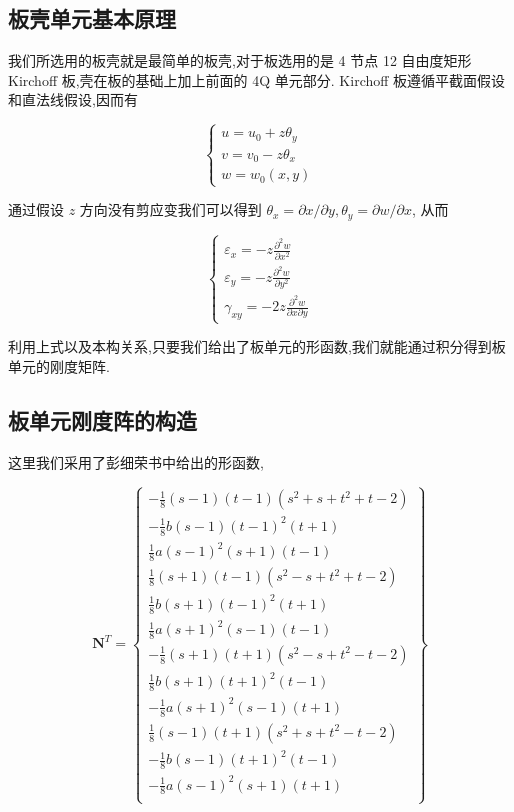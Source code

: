 
\subsection{板壳单元基本原理}
我们所选用的板壳就是最简单的板壳,对于板选用的是 4 节点 12 自由度矩形 Kirchoff 板,壳在板的基础上加上前面的 4Q 单元部分. Kirchoff 板遵循平截面假设和直法线假设,因而有

\[
\left\{ \begin{gathered}
u=u_0+z\theta_y \\
v=v_0-z\theta_x \\
w=w_0(x,y)
\end{gathered} \right.
\]

通过假设 $z$ 方向没有剪应变我们可以得到 $\theta_x=\partial x/\partial y, \theta_y=\partial w/\partial x$, 从而

\[
\left\{ \begin{gathered}
\varepsilon_x = -z\frac{\partial^2 w}{\partial x^2} \\
\varepsilon_y = -z\frac{\partial^2 w}{\partial y^2} \\
\gamma_{xy} = -2z\frac{\partial^2 w}{\partial x \partial y}
\end{gathered} \right.
\]

利用上式以及本构关系,只要我们给出了板单元的形函数,我们就能通过积分得到板单元的刚度矩阵.

\subsection{板单元刚度阵的构造}

这里我们采用了彭细荣书中给出的形函数,

\[ \mathbf{N}^T=\left\{
\begin{array}{c}
-\frac{1}{8}(s-1)(t-1)(s^2+s+t^2+t-2)\\ -\frac{1}{8}b(s-1)(t-1)^2(t+1)\\ \frac{1}{8}a(s-1)^2(s+1)(t-1) \\
\frac{1}{8}(s+1)(t-1)(s^2-s+t^2+t-2) \\ \frac{1}{8}b(s+1)(t-1)^2(t+1) \\ \frac{1}{8}a(s+1)^2(s-1)(t-1) \\
-\frac{1}{8}(s+1)(t+1)(s^2-s+t^2-t-2)\\ \frac{1}{8}b(s+1)(t+1)^2(t-1) \\ -\frac{1}{8}a(s+1)^2(s-1)(t+1) \\
\frac{1}{8}(s-1)(t+1)(s^2+s+t^2-t-2) \\ -\frac{1}{8}b(s-1)(t+1)^2(t-1) \\ -\frac{1}{8}a(s-1)^2(s+1)(t+1) \\
\end{array} \right\} \]

